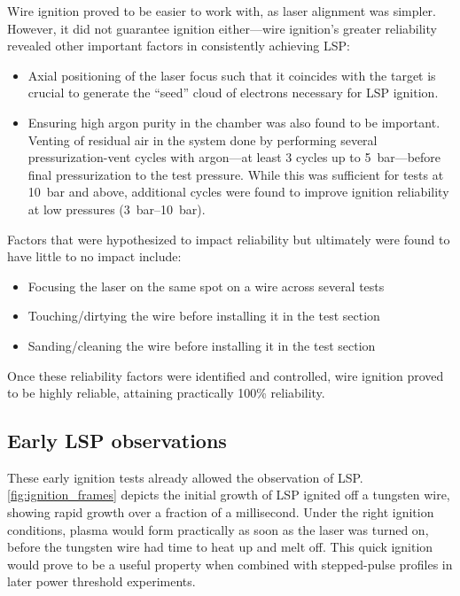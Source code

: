             Wire ignition proved to be easier to work with, as laser alignment was simpler. However, it did not guarantee ignition either---wire ignition's greater reliability revealed other important factors in consistently achieving LSP:
            \begin{itemize}
                \item Axial positioning of the laser focus such that it coincides with the target is crucial to generate the ``seed'' cloud of electrons necessary for LSP ignition.
                \item Ensuring high argon purity in the chamber was also found to be important. Venting of residual air in the system done by performing several pressurization-vent cycles with argon---at least 3 cycles up to \qty{5}{bar}---before final pressurization to the test pressure. While this was sufficient for tests at \qty{10}{bar} and above, additional cycles were found to improve ignition reliability at low pressures (\qtyrange{3}{10}{bar}).
            \end{itemize}
            Factors that were hypothesized to impact reliability but ultimately were found to have little to no impact include:
            \begin{itemize}
                \item Focusing the laser on the same spot on a wire across several tests
                \item Touching/dirtying the wire before installing it in the test section
                \item Sanding/cleaning the wire before installing it in the test section
            \end{itemize}
            Once these reliability factors were identified and controlled, wire ignition proved to be highly reliable, attaining practically 100\% reliability. 

        \subsection{Early LSP observations}
            These early ignition tests already allowed the observation of LSP. \autoref{fig:ignition_frames} depicts the initial growth of LSP ignited off a tungsten wire, showing rapid growth over a fraction of a millisecond. Under the right ignition conditions, plasma would form practically as soon as the laser was turned on, before the tungsten wire had time to heat up and melt off. This quick ignition would prove to be a useful property when combined with stepped-pulse profiles in later power threshold experiments. 

